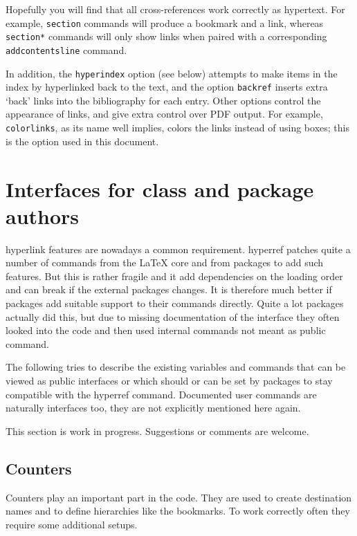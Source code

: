 \documentclass{article}
\newcommand*{\xpackage}[1]{\textsf{#1}}
\newcommand{\bs}{\symbol{'134}}%
\newcommand{\ci}[1]{\texttt{\bs#1}}
\begin{document}
Hopefully you will find that all cross-references
work correctly as hypertext. For example, \ci{section} commands will
produce a bookmark and a link, whereas \ci{section*} commands will only
show links when paired with a corresponding \ci{addcontentsline}
command.

In addition, the \texttt{hyperindex} option (see below) attempts to make
items in the index by hyperlinked back to the text, and the option
\texttt{backref} inserts extra `back' links into the bibliography for
each entry. Other options control the appearance of links, and give
extra control over PDF output. For example, \texttt{colorlinks}, as its
name well implies, colors the links instead of using boxes; this is the
option used in this document.

\section{Interfaces for class and package authors}

hyperlink features are nowadays a common requirement. \xpackage{hyperref}
patches quite a number of commands from the  \LaTeX{} core and from packages
to add such features. But this is rather fragile and it add dependencies
on the loading order and can break if the external packages changes.
It is therefore much better if packages add suitable support to their commands directly.
Quite a lot packages actually did this, but due to missing documentation of the interface
they often looked into the code and then used internal commands not meant as public command.

The following tries to describe the existing variables and commands that
can be viewed as public interfaces or which should or can be set by packages
to stay compatible with the \xpackage{hyperref} command. Documented user commands
are naturally interfaces too, they are not explicitly mentioned here again.

This section is work in progress. Suggestions or comments are welcome.


\subsection{Counters}
Counters play an important part in the code. They are used to create destination names and
to define hierarchies like the bookmarks. To work correctly often they require some additional
setups.
\end{document}
